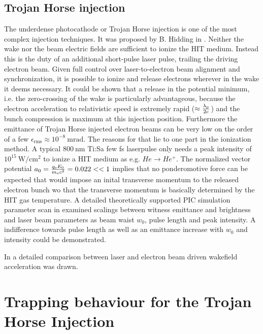 
\subsection{Trojan Horse injection}
\label{sec:Theory_TrojanHorse}
The underdense photocathode or Trojan Horse injection is one of the most complex injection techniques. It was proposed by B. Hidding in \cite{Hidding_PRL_2012}. Neither the wake nor the beam electric fields are sufficient to ionize the HIT medium. Instead this is the duty of an additional short-pulse laser pulse, trailing the driving electron beam. Given full control over laser-to-electron beam alignment and synchronization, it is possible to ionize and release electrons wherever in the wake it deems necessary. It could be shown that a release in the potential minimum, i.e. the zero-crossing of the wake is particularly advantageous, because the electron acceleration to relativistic speed is extremely rapid ($\approx \frac{\lambda_\mathrm{p}}{2c}$) and the bunch compression is maximum at this injection position. Furthermore the emittance of Trojan Horse injected electron beams can be very low on the order of a few $\epsilon_\mathrm{rms}\approx 10^{-8}\ \mathrm{m rad}$. The reasons for that lie to one part in the ionization method. A typical $800\ \mathrm{nm}$ Ti:Sa few fs laserpulse only needs a peak intensity of $10^{15}\ \mathrm{W/cm^2}$ to ionize a HIT medium as e.g. $He \rightarrow He^+$. The normalized vector potential $a_0 = \frac{q_\mathrm{e} E_0}{m_\mathrm{e} c^2} = 0.022<<1$ implies that no ponderomotive force can be expected that would impose an inital transverse momentum to the released electron bunch wo that the transverse momentum is basically determined by the HIT gas temperature. 
A detailed theoretically supported PIC simulation parameter scan in \cite{xi2013hybrid} examined scalings between witness emittance and brightness and laser beam parameters as beam waist $w_0$, pulse length and peak intensity. A indifference towards pulse length as well as an emittance increase with $w_0$ and intensity could be demonstrated.

In \cite{hidding2014ultrahigh} a detailed comparison between laser and electron beam driven wakefield acceleration was drawn.
 
\section{Trapping behaviour for the Trojan Horse Injection}


